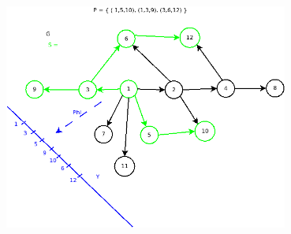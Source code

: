 \documentclass[11pt]{scrartcl}
\begin{document}
\begin{center}
  \includegraphics[width=0.7\textwidth]{Figur03.png}
\end{center}
\end{document}
